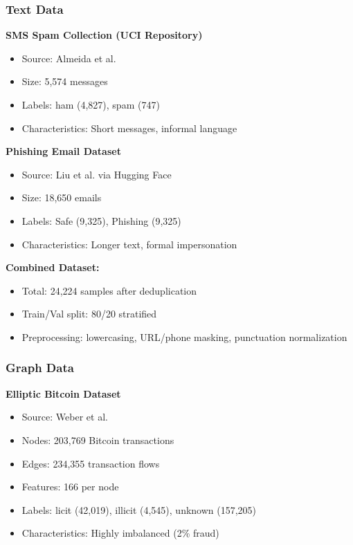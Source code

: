 \subsubsection{Text Data}

\textbf{SMS Spam Collection (UCI Repository)}
\begin{itemize}
    \item Source: Almeida et al. \cite{almeida2011contributions}
    \item Size: 5,574 messages
    \item Labels: ham (4,827), spam (747)
    \item Characteristics: Short messages, informal language
\end{itemize}

\textbf{Phishing Email Dataset}
\begin{itemize}
    \item Source: Liu et al. \cite{liu2022phishing} via Hugging Face
    \item Size: 18,650 emails
    \item Labels: Safe (9,325), Phishing (9,325)
    \item Characteristics: Longer text, formal impersonation
\end{itemize}

\textbf{Combined Dataset:}
\begin{itemize}
    \item Total: 24,224 samples after deduplication
    \item Train/Val split: 80/20 stratified
    \item Preprocessing: lowercasing, URL/phone masking, punctuation normalization
\end{itemize}

\subsubsection{Graph Data}

\textbf{Elliptic Bitcoin Dataset}
\begin{itemize}
    \item Source: Weber et al. \cite{weber2019anti}
    \item Nodes: 203,769 Bitcoin transactions
    \item Edges: 234,355 transaction flows
    \item Features: 166 per node
    \item Labels: licit (42,019), illicit (4,545), unknown (157,205)
    \item Characteristics: Highly imbalanced (2\% fraud)
\end{itemize}

